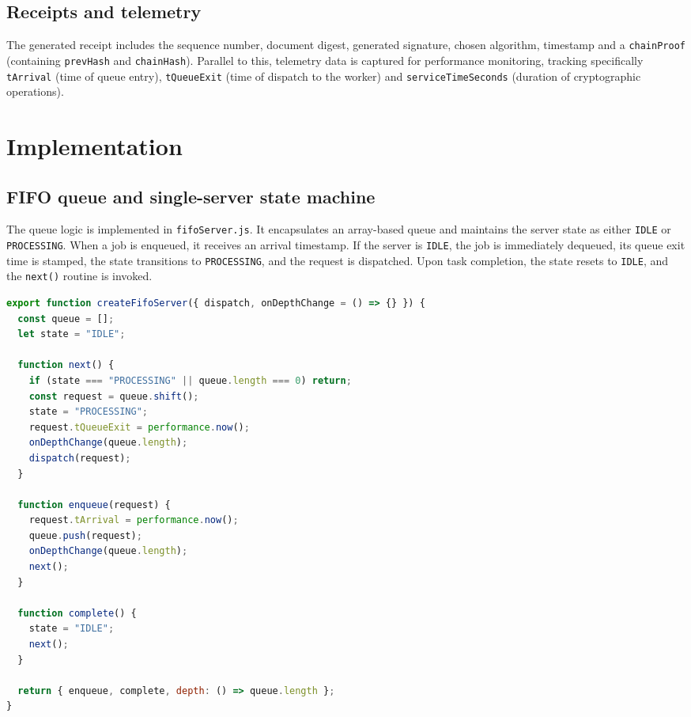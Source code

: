 \documentclass[11pt,a4paper]{article}
\begin{document}
\begin{spacing}{1.1}
\subsection{Receipts and telemetry}
The generated receipt includes the sequence number, document digest, generated signature, chosen algorithm, timestamp and a \texttt{chainProof} (containing \texttt{prevHash} and \texttt{chainHash}). Parallel to this, telemetry data is captured for performance monitoring, tracking specifically \texttt{tArrival} (time of queue entry), \texttt{tQueueExit} (time of dispatch to the worker) and \texttt{serviceTimeSeconds} (duration of cryptographic operations).

\pagebreak{}

\section{Implementation}

\subsection{FIFO queue and single-server state machine}
The queue logic is implemented in \texttt{fifoServer.js}. It encapsulates an array-based queue and maintains the server state as either \texttt{IDLE} or \texttt{PROCESSING}. When a job is enqueued, it receives an arrival timestamp. If the server is \texttt{IDLE}, the job is immediately dequeued, its queue exit time is stamped, the state transitions to \texttt{PROCESSING}, and the request is dispatched. Upon task completion, the state resets to \texttt{IDLE}, and the \texttt{next()} routine is invoked.

\begin{lstlisting}[language=JavaScript, caption=queue/fifoServer.js]
export function createFifoServer({ dispatch, onDepthChange = () => {} }) {
  const queue = [];
  let state = "IDLE";

  function next() {
    if (state === "PROCESSING" || queue.length === 0) return;
    const request = queue.shift();
    state = "PROCESSING";
    request.tQueueExit = performance.now();
    onDepthChange(queue.length);
    dispatch(request);
  }

  function enqueue(request) {
    request.tArrival = performance.now();
    queue.push(request);
    onDepthChange(queue.length);
    next();
  }

  function complete() {
    state = "IDLE";
    next();
  }

  return { enqueue, complete, depth: () => queue.length };
}
\end{lstlisting}


\end{spacing}
\end{document}
